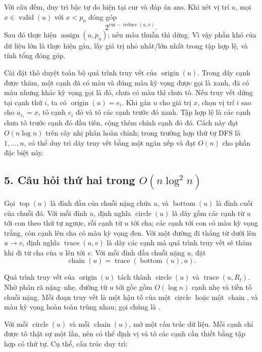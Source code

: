 \documentclass[11pt]{article}
\begin{document}
Với câu đếm, duy trì bậc tự do hiện tại \(\mathrm{cur}\) và đáp án
\(\mathrm{ans}\). Khi xét vị trí \(u\), mọi \(x\in\operatorname{valid}(u)\) với
\(x<p_u\) đóng góp
\[
  2^{\mathrm{cur}-\operatorname{reduce}(u,x)}.
\]
Sau đó thực hiện \(\operatorname{assign}(u,p_u)\); nếu mâu thuẫn thì dừng. Vì
vậy phần khó của dữ liệu lớn là thực hiện gán, lấy giá trị nhỏ nhất/lớn nhất
trong tập hợp lệ, và tính tổng đóng góp.

Cài đặt thô duyệt toàn bộ quá trình truy vết của \(\operatorname{origin}(u)\).
Trong dãy cạnh được thăm, một cạnh đã có màu và đúng màu kỳ vọng được gọi là
xanh, đã có màu nhưng khác kỳ vọng gọi là đỏ, chưa có màu thì chưa tô. Nếu
truy vết dừng tại cạnh thứ \(i\), ta có \(\operatorname{origin}(u)=e_i\). Khi
gán \(u\) cho giá trị \(x\), chọn vị trí \(i\) sao cho \(a_{e_i}=x\), tô cạnh
\(e_i\) đỏ và tô các cạnh trước đó xanh. Tập hợp lệ là các cạnh chưa tô trước
cạnh đỏ đầu tiên, cộng thêm chính cạnh đỏ đó. Cách này đạt \(O(n\log n)\) trên
cây nhị phân hoàn chỉnh; trong trường hợp thứ tự DFS là \(1,\ldots,n\), có thể
duy trì dãy truy vết bằng một ngăn xếp và đạt \(O(n)\) cho phần đặc biệt này.

\subsection*{5. Câu hỏi thứ hai trong \(O(n\log^2 n)\)}

Gọi \(\operatorname{top}(u)\) là đỉnh đầu của chuỗi nặng chứa \(u\), và
\(\operatorname{bottom}(u)\) là đỉnh cuối của chuỗi đó. Với mỗi đỉnh \(u\),
định nghĩa \(\operatorname{circle}(u)\) là dãy gồm các cạnh từ \(u\) tới con
theo thứ tự ngược, rồi cạnh từ \(u\) tới cha; các cạnh tới con có màu kỳ vọng
trắng, còn cạnh lên cha có màu kỳ vọng đen. Với một đường đi thẳng từ dưới lên
\(u\to v\), định nghĩa \(\operatorname{trace}(u,v)\) là dãy các cạnh mà
quá trình truy vết sẽ thăm khi đi từ cha của \(u\) lên tới \(v\). Với mỗi đỉnh
đầu chuỗi nặng \(u\), đặt
\[
  \operatorname{chain}(u)=\operatorname{trace}(\operatorname{bottom}(u),u).
\]

Quá trình truy vết của \(\operatorname{origin}(u)\) tách thành
\(\operatorname{circle}(u)\) và \(\operatorname{trace}(u,R_t)\). Nhờ phân rã
nặng--nhẹ, đường từ \(u\) tới gốc gồm \(O(\log n)\) cạnh nhẹ và tiền tố chuỗi
nặng. Mỗi đoạn truy vết là một hậu tố của một \(\operatorname{circle}\) hoặc
một \(\operatorname{chain}\), và màu kỳ vọng hoàn toàn trùng nhau; gọi chúng là
.

Với mỗi \(\operatorname{circle}(u)\) và mỗi \(\operatorname{chain}(u)\), mở một
cấu trúc dữ liệu. Mỗi cạnh chỉ được tô thật sự một lần, nên có thể định vị và
tô các cạnh cần thiết bằng tập hợp có thứ tự. Cụ thể, cấu trúc duy trì:
\end{document}
